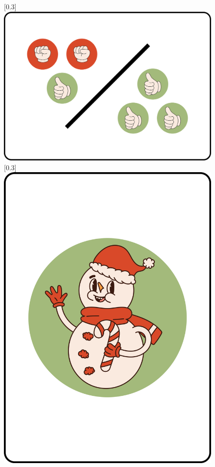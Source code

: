 \documentclass[11pt, parskip=half]{scrartcl}
\begin{document}
      \begin{figure}[ht]
      \centering
      [0.3\textwidth]{\includegraphics[scale=0.15]{Images/score_card_display.png}}
      [0.3\textwidth]{\includegraphics[scale=0.15]{Images/snowman_card_display.png}}


\end{figure}
\end{document}
